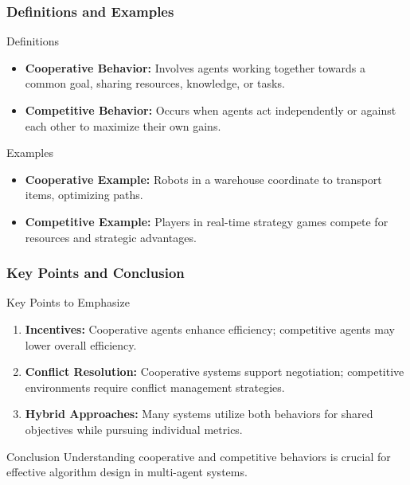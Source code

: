 \documentclass[aspectratio=169]{beamer}
\begin{document}
\begin{frame}[fragile]
    \frametitle{Definitions and Examples}
    \begin{block}{Definitions}
        \begin{itemize}
            \item \textbf{Cooperative Behavior:} Involves agents working together towards a common goal, sharing resources, knowledge, or tasks.
            \item \textbf{Competitive Behavior:} Occurs when agents act independently or against each other to maximize their own gains.
        \end{itemize}
    \end{block}
    
    \begin{block}{Examples}
        \begin{itemize}
            \item \textbf{Cooperative Example:} Robots in a warehouse coordinate to transport items, optimizing paths.
            \item \textbf{Competitive Example:} Players in real-time strategy games compete for resources and strategic advantages.
        \end{itemize}
    \end{block}
\end{frame}

\begin{frame}[fragile]
    \frametitle{Key Points and Conclusion}
    \begin{block}{Key Points to Emphasize}
        \begin{enumerate}
            \item \textbf{Incentives:} Cooperative agents enhance efficiency; competitive agents may lower overall efficiency.
            \item \textbf{Conflict Resolution:} Cooperative systems support negotiation; competitive environments require conflict management strategies.
            \item \textbf{Hybrid Approaches:} Many systems utilize both behaviors for shared objectives while pursuing individual metrics.
        \end{enumerate}
    \end{block}

    \begin{block}{Conclusion}
        Understanding cooperative and competitive behaviors is crucial for effective algorithm design in multi-agent systems.
    \end{block}
\end{frame}
\end{document}
